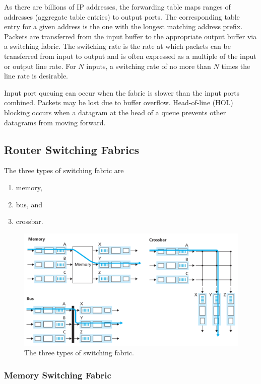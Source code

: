 As there are billions of IP addresses, the forwarding table maps ranges of addresses (aggregate table entries) to output ports.
The corresponding table entry for a given address is the one with the longest matching address prefix.
Packets are transferred from the input buffer to the appropriate output buffer via a switching fabric.
The switching rate is the rate at which packets can be transferred from input to output and is often expressed as a multiple of the input or output line rate.
For \(N\) inputs, a switching rate of no more than \(N\) times the line rate is desirable.

Input port queuing can occur when the fabric is slower than the input ports combined.
Packets may be lost due to buffer overflow.
Head-of-line (HOL) blocking occurs when a datagram at the head of a queue prevents other datagrams from moving forward.

\subsection{Router Switching Fabrics}

The three types of switching fabric are
\begin{enumerate}
  \item memory,
  \item bus, and
  \item crossbar.
\end{enumerate}

\begin{figure}[htp]
  \centering
  \includegraphics[width=15cm]{unit-19/figures/switching-fabrics.png}
  \caption{The three types of switching fabric.}
\end{figure}

\subsubsection{Memory Switching Fabric}

